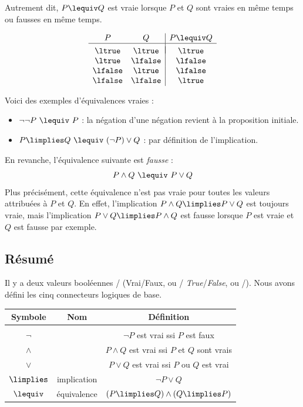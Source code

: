 \documentclass[11pt,class=report,crop=false]{standalone}
\begin{document}
Autrement dit, $P \lequiv Q$ est vraie lorsque $P$ et $Q$ sont vraies en même temps ou fausses en même temps.

\[
\begin{array}{c c | c}
	P		& Q 		& P \lequiv Q \\
	\hline
	&&	\\[-2ex]
	\ltrue 	& \ltrue 	& \ltrue \\
	\ltrue 	& \lfalse 	& \lfalse \\
	\lfalse & \ltrue 	& \lfalse \\	
	\lfalse & \lfalse 	& \ltrue \\		
\end{array}
\]

Voici des exemples d'équivalences vraies :
\begin{itemize}
	\item $\lnot \lnot P \ \lequiv \ P$ : la négation d'une négation revient à la proposition initiale.
	
	\item $P \limplies Q \ \lequiv \ (\lnot P) \lor Q$ : par définition de l'implication.
\end{itemize}

En revanche, l'équivalence suivante est \emph{fausse} :
\[
P \land Q \ \lequiv \ P \lor Q
\]
Plus précisément, cette équivalence n'est pas vraie pour toutes les valeurs attribuées à $P$ et $Q$.
En effet, l'implication $P \land Q \limplies P \lor Q$ est toujours vraie, mais l'implication $P \lor Q \limplies P \land Q$ est fausse lorsque $P$ est vraie et $Q$ est fausse par exemple.


\subsection{Résumé}

Il y a deux valeurs booléennes \ltrue/\lfalse{} (Vrai/Faux, ou \ltruetrue/\lfalsefalse{} \emph{True}/\emph{False}, ou \lone/\lzero).
Nous avons défini les cinq connecteurs logiques de base.

\begin{center}
\begin{tabular}{| c | c | c |}
    \hline 
	\textbf{Symbole}		& \textbf{Nom} 		& \textbf{Définition} \\
	\hline
	&&	\\[-2ex]
	$\lnot$ 	& \tnot			& $\lnot P$ est vrai ssi $P$ est faux \\
	$\land$ 	& \tand			& $P \land Q$ est vrai ssi $P$ et $Q$ sont vrais \\	
	$\lor$ 		& \tor			& $P \lor Q$ est vrai ssi $P$ ou $Q$ est vrai \\	
	$\limplies$ 	& implication	& $\lnot P \lor Q$ \\	
	$\lequiv$ 	& équivalence	& $(P \limplies Q) \land (Q \limplies P)$ \\
    \hline				
\end{tabular}
\end{center}
\end{document}
